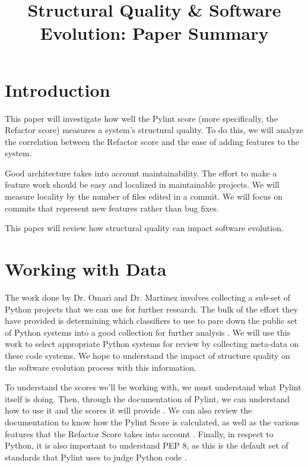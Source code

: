 \documentclass[conference]{IEEEtran}
\begin{document}
\title{Structural Quality \& Software Evolution: \newline Paper Summary}

\author{
}

\maketitle

\section{Introduction}
This paper will investigate how well the Pylint score (more specifically, the Refactor score) measures a system's structural quality. To do this, we will analyze the correlation between the Refactor score and the ease of adding features to the system.

Good architecture takes into account maintainability. The effort to make a feature work should be easy and localized in maintainable projects. We will measure locality by the number of files edited in a commit. We will focus on commits that represent new features rather than bug fixes.

This paper will review how structural quality can impact software evolution.

\section{Working with Data}

The work done by Dr. Omari and Dr. Martinez involves collecting a sub-set of Python projects that we can use for further research. The bulk of the effort they have provided is determining which classifiers to use to pare down the public set of Python systems into a good collection for further analysis \cite{omari:2018}. We will use this work to select appropriate Python systems for review by collecting meta-data on these code systems. We hope to understand the impact of structure quality on the software evolution process with this information.

To understand the scores we'll be working with, we must understand what Pylint itself is doing. Then, through the documentation of Pylint, we can understand how to use it and the scores it will provide \cite{pylint:main}. We can also review the documentation to know how the Pylint Score is calculated, as well as the various features that the Refactor Score takes into account \cite{pylint:score}. Finally, in respect to Python, it is also important to understand PEP 8, as this is the default set of standards that Pylint uses to judge Python code \cite{pylint:pep8}.
\end{document}
